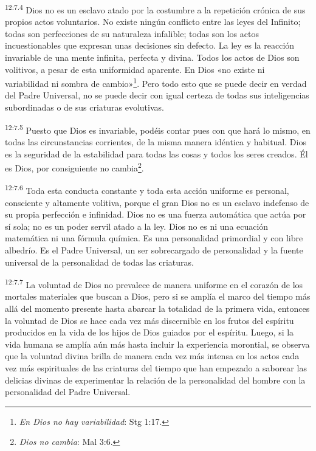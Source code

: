 \par
\textsuperscript{12:7.4} Dios no es un esclavo atado por la costumbre a la repetición crónica de sus propios actos voluntarios. No existe ningún conflicto entre las leyes del Infinito; todas son perfecciones de su naturaleza infalible; todas son los actos incuestionables que expresan unas decisiones sin defecto. La ley es la reacción invariable de una mente infinita, perfecta y divina. Todos los actos de Dios son volitivos, a pesar de esta uniformidad aparente. En Dios «no existe ni variabilidad ni sombra de cambio»\footnote{\textit{En Dios no hay variabilidad}: Stg 1:17.}. Pero todo esto que se puede decir en verdad del Padre Universal, no se puede decir con igual certeza de todas sus inteligencias subordinadas o de sus criaturas evolutivas.

\par
\textsuperscript{12:7.5} Puesto que Dios es invariable, podéis contar pues con que hará lo mismo, en todas las circunstancias corrientes, de la misma manera idéntica y habitual. Dios es la seguridad de la estabilidad para todas las cosas y todos los seres creados. Él es Dios, por consiguiente no cambia\footnote{\textit{Dios no cambia}: Mal 3:6.}.

\par
\textsuperscript{12:7.6} Toda esta conducta constante y toda esta acción uniforme es personal, consciente y altamente volitiva, porque el gran Dios no es un esclavo indefenso de su propia perfección e infinidad. Dios no es una fuerza automática que actúa por sí sola; no es un poder servil atado a la ley. Dios no es ni una ecuación matemática ni una fórmula química. Es una personalidad primordial y con libre albedrío. Es el Padre Universal, un ser sobrecargado de personalidad y la fuente universal de la personalidad de todas las criaturas.

\par
\textsuperscript{12:7.7} La voluntad de Dios no prevalece de manera uniforme en el corazón de los mortales materiales que buscan a Dios, pero si se amplía el marco del tiempo más allá del momento presente hasta abarcar la totalidad de la primera vida, entonces la voluntad de Dios se hace cada vez más discernible en los frutos del espíritu producidos en la vida de los hijos de Dios guiados por el espíritu. Luego, si la vida humana se amplía aún más hasta incluir la experiencia morontial, se observa que la voluntad divina brilla de manera cada vez más intensa en los actos cada vez más espirituales de las criaturas del tiempo que han empezado a saborear las delicias divinas de experimentar la relación de la personalidad del hombre con la personalidad del Padre Universal.

